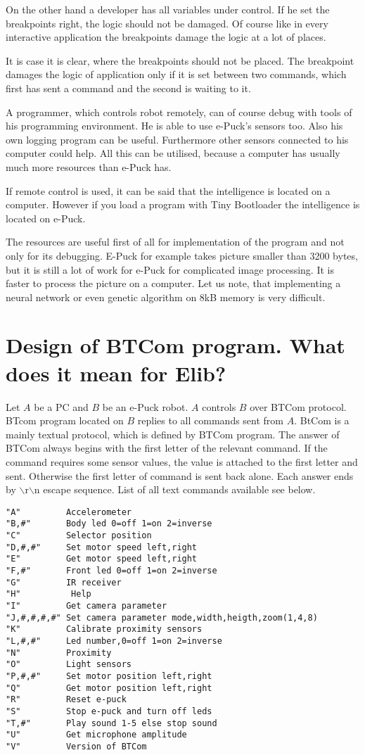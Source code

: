 	On the other hand a developer has all variables under control. If he set the breakpoints
	right, the logic should not be damaged. Of course like in every interactive application
	the breakpoints damage the logic at a lot of places. 
	
	It is case it is clear, where the breakpoints should not be placed.
	The breakpoint damages the logic of application only if it is set between two commands,
	which first has sent a command and the second is waiting to it.
	 
	A programmer, which controls robot remotely, can of course debug with tools of his programming environment.
	He is able to use e-Puck's sensors too. Also his own logging program can be useful. 
	Furthermore other sensors connected to his computer could help.
	All this can be utilised, because a computer has usually much more resources than e-Puck has.
	 
	If remote control is used, it can be said that the intelligence 
	is located on a computer. However if you load a program with Tiny Bootloader the intelligence
	is located on e-Puck.
	 
	The resources are useful first of all for implementation of the program and not only for
	its debugging. E-Puck for example takes picture smaller than 3200 bytes, but it is still
	a lot of work for e-Puck for complicated image processing. It is faster to process the picture
	on a computer. Let us note, that implementing a neural network or even genetic algorithm on 8kB memory
	is very difficult.
\section{Design of BTCom program. What does it mean for Elib?}\label{sec:btcomdesign}
	 
	Let $A$ be a PC and $B$ be an e-Puck robot. $A$ controls $B$ over BTCom protocol. BTcom program located on $B$ 
	replies to all commands sent from $A$.
	BtCom is a mainly textual protocol, which is defined by BTCom program. The answer of BTCom always begins with the first letter of the relevant command.
	If the command requires some sensor values, the value is attached to the first letter and
	sent. Otherwise the first letter of command is sent back alone. Each answer ends by 
	$\backslash$r$\backslash$n escape sequence.
	List of all text commands available see below.
	\lstset{basicstyle=\small}
\begin{lstlisting}
"A"         Accelerometer
"B,#"       Body led 0=off 1=on 2=inverse
"C"         Selector position
"D,#,#"     Set motor speed left,right
"E"         Get motor speed left,right
"F,#"       Front led 0=off 1=on 2=inverse
"G"         IR receiver
"H"          Help
"I"         Get camera parameter
"J,#,#,#,#" Set camera parameter mode,width,heigth,zoom(1,4,8)
"K"         Calibrate proximity sensors
"L,#,#"     Led number,0=off 1=on 2=inverse
"N"         Proximity
"O"         Light sensors
"P,#,#"     Set motor position left,right
"Q"         Get motor position left,right
"R"         Reset e-puck
"S"         Stop e-puck and turn off leds
"T,#"       Play sound 1-5 else stop sound
"U"         Get microphone amplitude
"V"         Version of BTCom
\end{lstlisting}
	  
